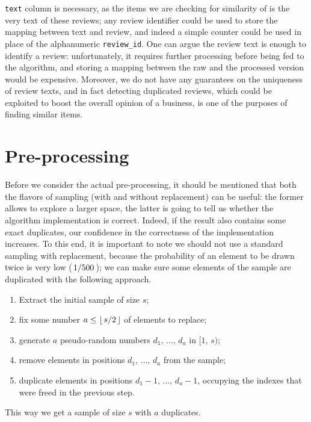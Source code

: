 \documentclass{article}
\begin{document}
  \texttt{text} column is necessary, as the items we are checking for
  similarity of is the very text of these reviews; any review identifier could
  be used to store the mapping between text and review, and indeed a simple
  counter could be used in place of the alphanumeric \texttt{review\_id}. One
  can argue the review text is enough to identify a review: unfortunately, it
  requires further processing before being fed to the algorithm, and storing a
  mapping between the raw and the processed version would be expensive.
  Moreover, we do not have any guarantees on the uniqueness of review texts,
  and in fact detecting duplicated reviews, which could be exploited to boost
  the overall opinion of a business, is one of the purposes of finding similar
  items.

  \section{Pre-processing}
  Before we consider the actual pre-processing, it should be mentioned that
  both the flavors of sampling (with and without replacement) can be useful:
  the former allows to explore a larger space, the latter is going to tell us
  whether the algorithm implementation is correct. Indeed, if the result also
  contains some exact duplicates, our confidence in the correctness of the
  implementation increases. To this end, it is important to note we should not
  use a standard sampling with replacement, because the probability of an
  element to be drawn twice is very low (\( \slashfrac{ 1 }{ 500 } \)); we can
  make sure some elements of the sample are duplicated with the following
  approach.
  \begin{enumerate}
    \item Extract the initial sample of size \( s \);
    \item fix some number \( a \leq \lfloor \slashfrac s 2 \rfloor \) of
    elements to replace;
    \item generate \( a \) pseudo-random numbers \( d_1, \, \dots, \, d_a \) in
    \( [ 1, \, s ) \);
    \item remove elements in positions \( d_1, \, \dots, \, d_a \) from the
    sample;
    \item duplicate elements in positions \( d_1 - 1, \, \dots, \, d_a - 1 \),
    occupying the indexes that were freed in the previous step.
  \end{enumerate}
  This way we get a sample of size \( s \) with \( a \) duplicates. \\
\end{document}
